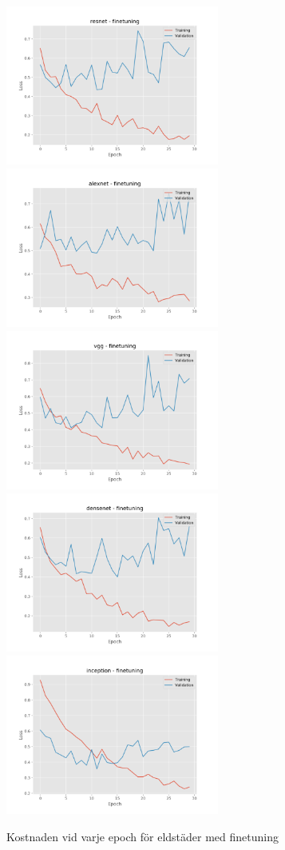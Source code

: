\documentclass[]{kththesis}
\begin{document}
  \begin{figure}[h]
    \includegraphics[width=7cm]{f_l_resnet_fine}
    \includegraphics[width=7cm]{f_l_alexnet_fine}
    \includegraphics[width=7cm]{f_l_vgg_fine}
    \includegraphics[width=7cm]{f_l_densenet_fine}
    \includegraphics[width=7cm]{f_l_inception_fine}
    \caption{Kostnaden vid varje epoch för eldstäder med finetuning}
    \label{fig:f_l_2}
  \end{figure}
\end{document}
